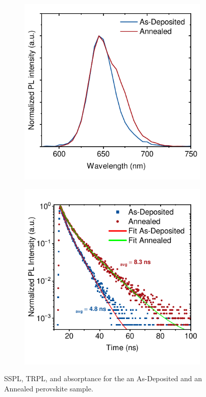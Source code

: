 \begin{figure}[htbp]
    \begin{subfigure}[t]{0.45\textwidth}
        \centering
        \includegraphics[width=\textwidth]{chapters/material_properties/images/SSPL_norm.pdf} %
        \caption{}
        \label{fig:ch2:norm_sspl}
    \end{subfigure}
    \hfill
    \begin{subfigure}[t]{0.45\textwidth}
        \centering
        \includegraphics[width=\textwidth]{chapters/material_properties/images/TRPL_norm_double - Copy.pdf} %
        \caption{}
        \label{fig:ch2:trpl}
    \end{subfigure}
    \caption{SSPL, TRPL, and absorptance for the an As-Deposited and an Annealed perovskite sample.}
\end{figure}

